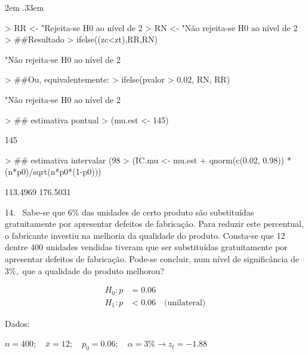 \documentclass{article}
\newenvironment{ManualExercise}
  {\begin{list}{}{\leftmargin \QuestionIndent
    \partopsep0pt \parsep\parskip \topsep\QuestionBefore
    \itemsep\QuestionBefore \labelwidth2em
    \labelsep.33em
    \usecounter{Question}}}
  {\end{list}}
\begin{document}
\begin{Exercise}
\begin{ManualExercise}
\begin{Schunk}
\begin{Sinput}
> RR <- "Rejeita-se H0 ao nível de 2%
> RN <- "Não rejeita-se H0 ao nível de 2%
> ##Resultado
> ifelse((zc<zt),RR,RN)
\end{Sinput}
\begin{Soutput}
[1] "Não rejeita-se H0 ao nível de 2%
\end{Soutput}
\begin{Sinput}
> ##Ou, equivalentemente:
> ifelse(pvalor > 0.02, RN, RR)
\end{Sinput}
\begin{Soutput}
[1] "Não rejeita-se H0 ao nível de 2%
\end{Soutput}
\begin{Sinput}
> ## estimativa pontual
> (mu.est <- 145)
\end{Sinput}
\begin{Soutput}
[1] 145
\end{Soutput}
\begin{Sinput}
> ## estimativa intervalar (98%
> (IC.mu <- mu.est + qnorm(c(0.02, 0.98)) * (n*p0)/sqrt(n*p0*(1-p0)))
\end{Sinput}
\begin{Soutput}
[1] 113.4969 176.5031
\end{Soutput}
\end{Schunk}

\item[14.~]Sabe-se que $6\%$ das unidades de certo produto são substituídas gratuitamente por apresentar defeitos de fabricação. Para reduzir este percentual, o fabricante investiu na melhoria da qualidade do produto. Consta-se que 12 dentre 400 unidades vendidas tiveram que ser substituídas gratuitamente por apresentar defeitos de fabricação. Pode-se concluir, num nível de significância de $3\%,$ que a qualidade do produto melhorou?

\begin{align*}
H_{0}: p&=0.06 \\
H_{1}: p&< 0.06\quad \textrm{(unilateral)}
\end{align*}

Dados:

$n=400;\quad \bar{x}=12;\quad p_{0}=0.06;\quad \alpha=3\% \rightarrow z_{t}=-1.88$


\end{ManualExercise}
\end{Exercise}
\end{document}
